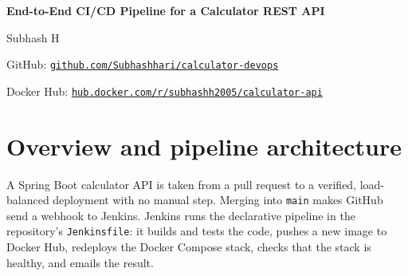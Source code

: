 \documentclass[10pt,a4paper]{article}
\newcommand{\cmd}[1]{\texttt{#1}}
\begin{document}
\begin{center}
{\Large\bfseries End-to-End CI/CD Pipeline for a Calculator REST API\par}
\vspace{3pt}
{\small Subhash H\par}
{\small GitHub: \href{https://github.com/Subhashhari/calculator-devops}{\textcolor{accent}{\texttt{github.com/Subhashhari/calculator-devops}}}\par}
{\small Docker Hub: \href{https://hub.docker.com/r/subhashh2005/calculator-api}{\textcolor{accent}{\texttt{hub.docker.com/r/subhashh2005/calculator-api}}}\par}
\end{center}

\section{Overview and pipeline architecture}
A Spring Boot calculator API is taken from a pull request to a verified, load-balanced deployment with no manual step.
Merging into \cmd{main} makes GitHub send a webhook to Jenkins. Jenkins runs the declarative pipeline in the repository's \cmd{Jenkinsfile}: it builds and tests the code, pushes a new image to Docker Hub, redeploys the Docker Compose stack, checks that the stack is healthy, and emails the result.
\end{document}
